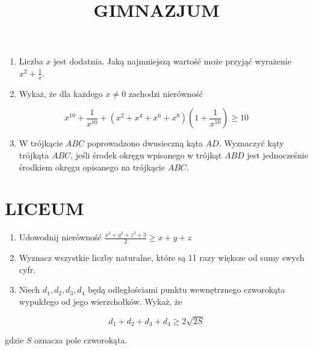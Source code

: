\documentclass[10pt]{article}
\title{GIMNAZJUM }
\author{}
\date{}
\begin{document}
\maketitle
\begin{enumerate}
  \item Liczba \(x\) jest dodatnia. Jaką najmniejszą wartość może przyjąć wyrażenie \(x^{2}+\frac{1}{x}\).
  \item Wykaż, że dla każdego \(x \neq 0\) zachodzi nierówność
\end{enumerate}

\[
x^{10}+\frac{1}{x^{10}}+\left(x^{2}+x^{4}+x^{6}+x^{8}\right)\left(1+\frac{1}{x^{10}}\right) \geq 10
\]

\begin{enumerate}
  \setcounter{enumi}{2}
  \item W trójkącie \(A B C\) poprowadzono dwusieczną kąta \(A D\). Wyznaczyć kąty trójkąta \(A B C\), jeśli środek okręgu wpisanego w trójkąt \(A B D\) jest jednocześnie środkiem okręgu opisanego na trójkącie \(A B C\).
\end{enumerate}

\section*{LICEUM}
\begin{enumerate}
  \item Udowodnij nierówność \(\frac{x^{2}+y^{2}+z^{2}+3}{2} \geq x+y+z\)
  \item Wyznacz wszystkie liczby naturalne, które są 11 razy większe od sumy swych cyfr.
  \item Niech \(d_{1}, d_{2}, d_{3}, d_{4}\) będą odległościami punktu wewnętrznego czworokąta wypukłego od jego wierzchołków. Wykaż, że
\end{enumerate}

\[
d_{1}+d_{2}+d_{3}+d_{4} \geq 2 \sqrt{2 S}
\]

gdzie \(S\) oznacza pole czworokąta.
\end{document}
